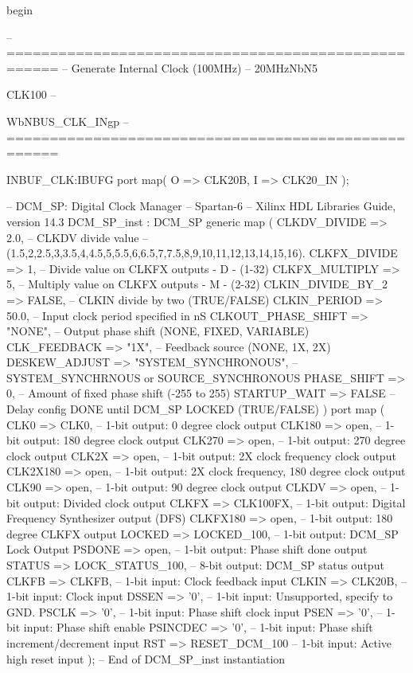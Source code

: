 \begin{mylisting}[language=VHDL,caption=トップモジュール,label=appF_Top_module_VHDL]
begin

-- ====================================================
-- Generate Internal Clock (100MHz)
--   20MHzNbN5{{CLK100
--   {WbNBUS_CLK_INgp
-- ====================================================

	INBUF_CLK:IBUFG
		port map(
			O	=> CLK20B,
			I	=> CLK20_IN
			);

-- DCM_SP: Digital Clock Manager
-- Spartan-6
-- Xilinx HDL Libraries Guide, version 14.3
	DCM_SP_inst : DCM_SP
		generic map (
			CLKDV_DIVIDE 			=> 2.0, 					-- CLKDV divide value
																-- (1.5,2,2.5,3,3.5,4,4.5,5,5.5,6,6.5,7,7.5,8,9,10,11,12,13,14,15,16).
			CLKFX_DIVIDE 			=> 1, 						-- Divide value on CLKFX outputs - D - (1-32)
			CLKFX_MULTIPLY 			=> 5, 						-- Multiply value on CLKFX outputs - M - (2-32)
			CLKIN_DIVIDE_BY_2 		=> FALSE, 					-- CLKIN divide by two (TRUE/FALSE)
			CLKIN_PERIOD 			=> 50.0, 					-- Input clock period specified in nS
			CLKOUT_PHASE_SHIFT 		=> "NONE", 					-- Output phase shift (NONE, FIXED, VARIABLE)
			CLK_FEEDBACK 			=> "1X", 					-- Feedback source (NONE, 1X, 2X)
			DESKEW_ADJUST 			=> "SYSTEM_SYNCHRONOUS", 	-- SYSTEM_SYNCHRNOUS or SOURCE_SYNCHRONOUS
			PHASE_SHIFT 			=> 0, 						-- Amount of fixed phase shift (-255 to 255)
			STARTUP_WAIT 			=> FALSE 					-- Delay config DONE until DCM_SP LOCKED (TRUE/FALSE)
		)
		port map (
			CLK0 		=> CLK0, 						-- 1-bit output: 0 degree clock output
			CLK180 		=> open, 						-- 1-bit output: 180 degree clock output
			CLK270 		=> open, 						-- 1-bit output: 270 degree clock output
			CLK2X 		=> open, 						-- 1-bit output: 2X clock frequency clock output
			CLK2X180 	=> open, 						-- 1-bit output: 2X clock frequency, 180 degree clock output
			CLK90 		=> open, 						-- 1-bit output: 90 degree clock output
			CLKDV 		=> open, 						-- 1-bit output: Divided clock output
			CLKFX 		=> CLK100FX, 					-- 1-bit output: Digital Frequency Synthesizer output (DFS)
			CLKFX180 	=> open, 						-- 1-bit output: 180 degree CLKFX output
			LOCKED 		=> LOCKED_100, 					-- 1-bit output: DCM_SP Lock Output
			PSDONE 		=> open, 						-- 1-bit output: Phase shift done output
			STATUS 		=> LOCK_STATUS_100, 			-- 8-bit output: DCM_SP status output
			CLKFB 		=> CLKFB, 						-- 1-bit input: Clock feedback input
			CLKIN 		=> CLK20B, 						-- 1-bit input: Clock input
			DSSEN 		=> '0', 						-- 1-bit input: Unsupported, specify to GND.
			PSCLK 		=> '0', 						-- 1-bit input: Phase shift clock input
			PSEN 		=> '0', 						-- 1-bit input: Phase shift enable
			PSINCDEC 	=> '0', 						-- 1-bit input: Phase shift increment/decrement input
			RST 		=> RESET_DCM_100 				-- 1-bit input: Active high reset input
		);
-- End of DCM_SP_inst instantiation

}}}
\end{mylisting}

